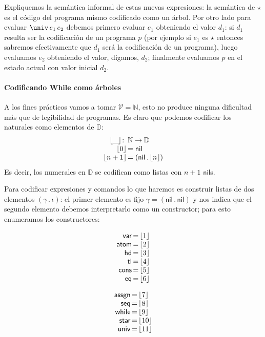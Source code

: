 \documentclass[a4paper,twoside,12pt]{article}
\newcommand{\trees}{\mathbb{D}}
\newcommand{\nil}{\mathsf{nil}}
\newcommand{\cons}[2]{(#1\, .\, #2)}
\newcommand{\vars}{\mathcal{V}}
\begin{document}
Expliquemos la semántica informal de estas nuevas expresiones: la
semántica de $\star$ es el código del programa mismo codificado como
un árbol. Por otro lado para evaluar $\univ\,e_1\,e_2$ debemos primero
evaluar $e_1$ obteniendo el valor $d_1$: si $d_1$ resulta ser la
codificación de un programa $p$ (por ejemplo si $e_1$ es $\star$ entonces
sabremos efectivamente que $d_1$ será la codificación de un programa),
luego evaluamos $e_2$ obteniendo el valor, digamos, $d_2$; finalmente
evaluamos $p$ en el estado actual con valor inicial $d_2$. 

\paragraph{Codificando While como árboles}

\newcommand{\toD}[1]{\lfloor #1 \rfloor }
\newcommand{\toDF}{\toD{\_}}
\newcommand{\fromD}[1]{\lceil #1 \rceil }
\newcommand{\fromDF}{\fromD{\_}}
A los fines prácticos vamos a tomar $\vars = \mathbb N$, esto no produce
ninguna dificultad más que de legibilidad de programas. Es claro que podemos
codificar los naturales como elementos de $\trees$:
\[
\begin{array}{r@{\,}l}
\toDF \colon & \mathbb N \to \trees\\
\toD{0} & = \nil\\
\toD{n+1} & = \cons{\nil}{\toD n}
\end{array}
\]
Es decir, los numerales en $\trees$ se codifican como listas con $n+1$
$\nil$s.

Para codificar expresiones y comandos lo que haremos es construir
listas de dos elementos $\cons \gamma \iota$: el primer elemento es
fijo $\gamma = \cons \nil \nil$ y nos indica que el segundo elemento
debemos interpretarlo como un constructor; para esto enumeramos los
constructores:

\begin{minipage}[t]{0.5\linewidth}
  \[
  \begin{array}{r@{\,=\,}l}
    \mathsf{var} & \toD 1\\
    \mathsf{atom} & \toD 2\\
    \mathsf{hd} & \toD 3\\
    \mathsf{tl} & \toD 4\\
    \mathsf{cons} & \toD 5\\
    \mathsf{eq} & \toD 6\\
  \end{array}
  \]
\end{minipage}
\begin{minipage}[t]{0.5\linewidth}
\[
\begin{array}{r@{\,=\,}l}
  \mathsf{assgn} & \toD 7\\
  \mathsf{seq} & \toD 8\\
  \mathsf{while} & \toD 9\\
  \mathsf{star} & \toD{10}\\
  \mathsf{univ} & \toD{11}\\
\end{array}
\]
\end{minipage}
\end{document}
